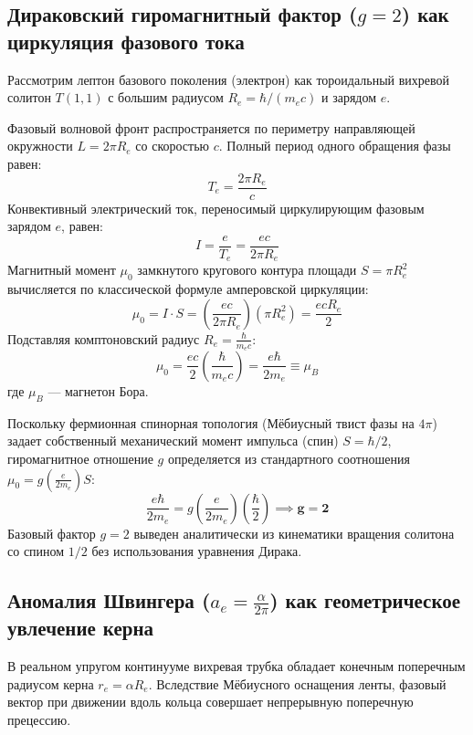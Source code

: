\documentclass[12pt,a4paper]{article}
\begin{document}
\subsection{Дираковский гиромагнитный фактор ($g=2$) как циркуляция фазового тока}
Рассмотрим лептон базового поколения (электрон) как тороидальный вихревой солитон $T(1,1)$ с большим радиусом $R_e = \hbar / (m_e c)$ и зарядом $e$.

Фазовый волновой фронт распространяется по периметру направляющей окружности $L = 2\pi R_e$ со скоростью $c$. Полный период одного обращения фазы равен:
\begin{equation}
	T_e = \frac{2\pi R_e}{c}
\end{equation}
Конвективный электрический ток, переносимый циркулирующим фазовым зарядом $e$, равен:
\begin{equation}
	I = \frac{e}{T_e} = \frac{e c}{2\pi R_e}
\end{equation}
Магнитный момент $\mu_0$ замкнутого кругового контура площади $S = \pi R_e^2$ вычисляется по классической формуле амперовской циркуляции:
\begin{equation}
	\mu_0 = I \cdot S = \left( \frac{e c}{2\pi R_e} \right) \left( \pi R_e^2 \right) = \frac{e c R_e}{2}
\end{equation}
Подставляя комптоновский радиус $R_e = \frac{\hbar}{m_e c}$:
\begin{equation}
	\mu_0 = \frac{e c}{2} \left( \frac{\hbar}{m_e c} \right) = \frac{e \hbar}{2 m_e} \equiv \mu_B
\end{equation}
где $\mu_B$ — магнетон Бора.

Поскольку фермионная спинорная топология (Мёбиусный твист фазы на $4\pi$) задает собственный механический момент импульса (спин) $S = \hbar/2$, гиромагнитное отношение $g$ определяется из стандартного соотношения $\mu_0 = g \left( \frac{e}{2 m_e} \right) S$:
\begin{equation}
	\frac{e \hbar}{2 m_e} = g \left( \frac{e}{2 m_e} \right) \left( \frac{\hbar}{2} \right) \implies \mathbf{g = 2}
\end{equation}
Базовый фактор $g=2$ выведен аналитически из кинематики вращения солитона со спином $1/2$ без использования уравнения Дирака.

\subsection{Аномалия Швингера ($a_e = \frac{\alpha}{2\pi}$) как геометрическое увлечение керна}
В реальном упругом континууме вихревая трубка обладает конечным поперечным радиусом керна $r_e = \alpha R_e$. Вследствие Мёбиусного оснащения ленты, фазовый вектор при движении вдоль кольца совершает непрерывную поперечную прецессию.
\end{document}
